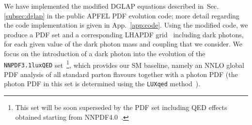 \documentclass[withindex,glossary]{cam-thesis}
\begin{document}
We have implemented the modified DGLAP equations described in~Sec. \ref{subsec:dglap} in the
public APFEL PDF evolution code; more detail regarding the code 
implementation is given in App.~\ref{app:code}. Using
the modified code, we produce a PDF set and a corresponding LHAPDF
grid~\cite{Buckley:2014ana} including dark photons, for each given
value of the dark photon mass and coupling that we consider. 
We focus on the introduction of a dark photon into the evolution of the
{\tt NNPDF3.1luxQED} set~\cite{Bertone:2017bme}\footnote{This
    set will be soon superseded by the PDF set including QED effects
    obtained starting from NNPDF4.0~\cite{Ball:2021leu}.}, which provides our
SM baseline, namely an NNLO
global PDF analysis of all standard parton flavours together with a photon PDF (the photon
PDF in this set is determined using the {\tt LUXqed}
method~\cite{Manohar:2017eqh}).
\end{document}
